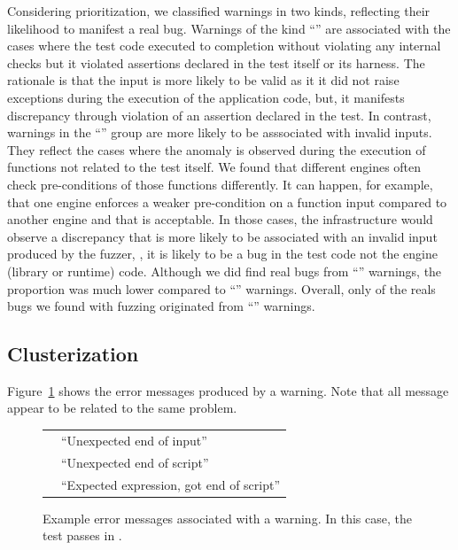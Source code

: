 \documentclass[10pt,conference,anonymous]{IEEEtran}
\begin{document}
Considering prioritization, we classified warnings in two kinds,
reflecting their likelihood to manifest a real bug. Warnings of the
kind ``\hi{}'' are associated with the cases where the test code
executed to completion without violating any internal checks but it
violated assertions declared in the test itself or its harness. The
rationale is that the input is more likely to be valid as it it did
not raise exceptions during the execution of the application code,
but, it manifests discrepancy through violation of an assertion
declared in the test. In contrast, warnings in the ``\lo{}'' group are
more likely to be asssociated with invalid inputs. They reflect the
cases where the anomaly is observed during the execution of functions
not related to the test itself. We found that different engines often
check pre-conditions of those functions differently. It can happen,
for example, that one engine enforces a weaker pre-condition on a
function input compared to another engine and that is acceptable. In
those cases, the infrastructure would observe a discrepancy that is
more likely to be associated with an invalid input produced by the
fuzzer, \ie{}, it is likely to be a bug in the test code not the
engine (library or runtime) code. Although we did find real bugs from
``\lo{}'' warnings, the proportion was much lower compared to
``\hi{}'' warnings. Overall, only  of the reals bugs we
found with fuzzing originated from ``\lo{}'' warnings. 

\subsection{Clusterization}


Figure~\ref{fig:err-messages} shows the error messages produced by a
\lo warning. Note that all message appear to be related to the same
problem.

\begin{figure}[h]
\begin{tabular}{ll}
\veight{} & ``Unexpected end of input''\\
\jsc{} & ``Unexpected end of script''\\
\smonkey{} & ``Expected expression, got end of script''
\end{tabular}
\caption{\label{fig:err-messages}Example error messages associated
  with a \lo{} warning. In this case, the test passes in \chakra.}
\end{figure}
\end{document}
